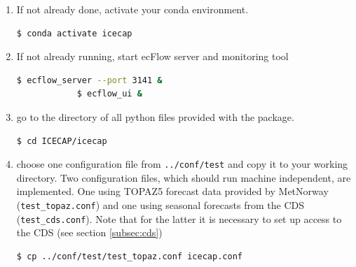 \documentclass[DIV=10, parskip=full]{scrreprt}
\begin{document}
\begin{enumerate}
	\item If not already done, activate your conda environment.
	\begin{lstlisting}[language=bash]
		$ conda activate icecap 
	\end{lstlisting}
	
	\item If not already running, start ecFlow server and monitoring tool 
		\begin{lstlisting}[language=bash]
			$ ecflow_server --port 3141 &
			$ ecflow_ui & 
		\end{lstlisting}

		
	\item go to the directory of all python files provided with the package.
	\begin{lstlisting}[language=bash]
		$ cd ICECAP/icecap
	\end{lstlisting}
	
	\item choose one configuration file from \texttt{../conf/test} and copy it to your working directory. Two configuration files, which should run machine independent, are implemented. One using TOPAZ5 forecast data provided by MetNorway (\texttt{test\_topaz.conf}) and one using seasonal forecasts from the CDS (\texttt{test\_cds.conf}). Note that for the latter it is necessary to set up access to the CDS (see section \ref{subsec:cds})\\
	\begin{lstlisting}[language=bash]
		$ cp ../conf/test/test_topaz.conf icecap.conf
	\end{lstlisting}
	

\end{enumerate}
\end{document}
